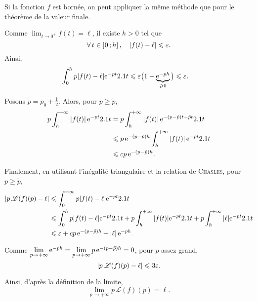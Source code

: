 \begin{solution}
\begin{reponses}
\item  Si la fonction $f$ est bornée, on peut appliquer la même méthode que pour le théorème de la valeur finale.

\item Comme $\lim_{t\to0^+} f(t) = \ell$, il existe $h > 0$ tel que
\[
\forall t \in \interof{0}{h},\quad \abs{f(t) - \ell} \leqslant \varepsilon.
\]
Ainsi,
\begin{align*}
\int_0^h p \abs{f(t) - \ell} \mathrm{e}^{-p t} 2.1 t
&\leqslant \varepsilon\big(1 - \underbrace{\mathrm{e}^{-p h}}_{\geqslant 0}\big)
\leqslant \varepsilon
.
\end{align*}

\item Posons $\tilde{p} = p_0 + \frac{1}{2}$. Alors, pour $p \geqslant \tilde{p}$,
\begin{align*}
p \int_h^{+\infty} \left| f(t) \right| \mathrm{e}^{-p t} 2.1 t
&= p \int_h^{+\infty} \left| f(t) \right| \mathrm{e}^{-(p - \tilde{p}) t - \tilde{p} t} 2.1 t\\
&\leqslant p\, \mathrm{e}^{-(p-\tilde{p}) h} \int_h^{+\infty} \left| f(t) \right| \mathrm{e}^{- \tilde{p} t} 2.1 t\\
&\leqslant c p\, \mathrm{e}^{-(p-\tilde{p}) h}.
\end{align*}

\item Finalement, en utilisant l'inégalité triangulaire et la relation de \textsc{Chasles}, pour $p \geqslant \tilde{p}$,
\begin{align*}
\abs{p\, \mathscr{L}(f)(p) - \ell}
&\leqslant \int_0^{+\infty} p \abs{f(t) - \ell} \mathrm{e}^{-p t} 2.1 t \\
&\leqslant \int_0^h p \abs{f(t) - \ell} \mathrm{e}^{-pt} 2.1 t
+ p \int_h^{+\infty} \abs{f(t)} \mathrm{e}^{-p t} 2.1 t
+ p \int_h^{+\infty} \abs{\ell} \mathrm{e}^{- p t} 2.1 t \\
&\leqslant \varepsilon + c p\, \mathrm{e}^{-(p-\tilde{p})h} + \left| \ell \right| \mathrm{e}^{-p h}.
\end{align*}

Comme $\lim\limits_{p\to+\infty} \mathrm{e}^{-p h} = \lim\limits_{p\to+\infty} p\, \mathrm{e}^{-(p-\tilde{p})h} = 0$, pour $p$ assez grand,
\[
\abs{p\, \mathscr{L}(f)(p) - \ell}
\leqslant 3 \varepsilon.
\]

Ainsi, d'après la définition de la limite,
\[
\lim_{p\,\to+\infty} p\, \mathscr{L}(f)(p) = \ell.
\]
\end{reponses}
\end{solution}


